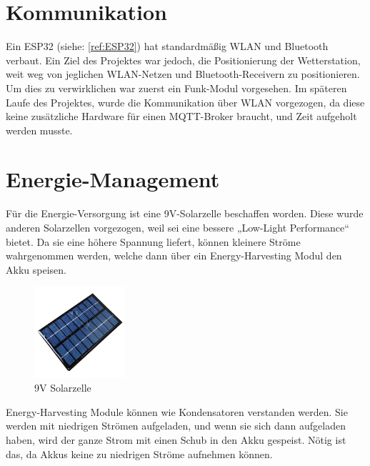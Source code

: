         
    \section{Kommunikation}
    
         Ein ESP32 (siehe: \ref{ref:ESP32}) hat standardmäßig WLAN und Bluetooth verbaut. Ein Ziel des Projektes war jedoch, die Positionierung der Wetterstation, weit weg von jeglichen WLAN-Netzen und Bluetooth-Receivern zu positionieren. Um dies zu verwirklichen war zuerst ein Funk-Modul vorgesehen. 
         Im späteren Laufe des Projektes, wurde die Kommunikation über WLAN vorgezogen, da diese keine zusätzliche Hardware für einen MQTT-Broker braucht, und Zeit aufgeholt werden musste.
        
\pagebreak
        
    \section{Energie-Management}
    
         Für die Energie-Versorgung ist eine 9V-Solarzelle beschaffen worden. Diese wurde anderen Solarzellen vorgezogen, weil sei eine bessere „Low-Light Performance“ bietet. Da sie eine höhere Spannung liefert, können kleinere Ströme wahrgenommen werden, welche dann über ein Energy-Harvesting Modul den Akku speisen.
        
        \begin{figure}[H]
            \centering
            \includegraphics[width=0.3\textwidth]{./media/images/SolarPanel.jpg}
            \caption{9V Solarzelle \cite{bib:SolarPanel}}
            \label{fig:SolarPanel}
        \end{figure}
        
        Energy-Harvesting Module können wie Kondensatoren verstanden werden. Sie werden mit niedrigen Strömen aufgeladen, und wenn sie sich dann aufgeladen haben, wird der ganze Strom mit einen Schub in den Akku gespeist. Nötig ist das, da Akkus keine zu niedrigen Ströme aufnehmen können. 
        
